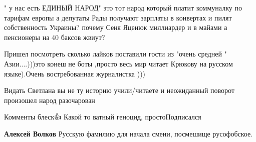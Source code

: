 \begin{itemize}
 
" у нас есть ЕДИНЫЙ НАРОД" это тот народ который платит коммуналку по тарифам европы а депутаты Рады получают зарплаты в конвертах и пилят собственность Украины? почему Сеня Яценюк миллиардер и в майами а пенсионеры на 40 баксов жвиут?

 
Пришел посмотреть сколько лайков поставили гости из "очень средней " Азии....)))это конеш не боты ,просто весь мир читает Крюкову на русском языке).Очень востребованная журналистка )))

 
Видать Светлана вы не ту историю учили/читаете и неожиданный поворот произошел народ разочарован

 
Комменты блеск👍 Какой то ватный геноцид, просто\Laughey[1.0][white] Подписался👀

\begin{itemize}
 
\textbf{Алексей Волков} Русскую фамилию для начала смени, посмешище русофобское.
\end{itemize}

 

\end{itemize}

